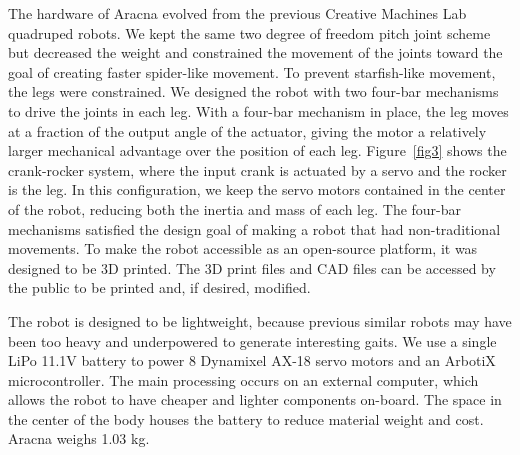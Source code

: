 \documentclass[letterpaper]{article}
\begin{document}

The hardware of Aracna evolved from the previous Creative Machines Lab
quadruped robots. We kept the same two degree of freedom pitch joint
scheme but decreased the weight and constrained the movement of the
joints toward the goal of creating faster spider-like movement. To
prevent starfish-like movement, the legs were constrained. We designed
the robot with two four-bar mechanisms to drive the joints in each
leg. With a four-bar mechanism in place, the leg moves at a fraction
of the output angle of the actuator, giving the motor a relatively
larger mechanical advantage over the position of each leg.
Figure~\ref{fig3} shows the crank-rocker system, where the input crank
is actuated by a servo and the rocker is the leg. In this
configuration, we keep the servo motors contained in the center of the
robot, reducing both the inertia and mass of each leg. The four-bar
mechanisms satisfied the design goal of making a robot that had
non-traditional movements.  To make the robot
accessible as an open-source platform, it was designed to be 3D
printed. The 3D print files and CAD files can be accessed by the
public to be printed and, if desired, modified.

The robot is designed to be lightweight, because previous similar
robots may have been too heavy and underpowered to generate
interesting gaits. We use a single LiPo 11.1V battery to
power 8 Dynamixel AX-18 servo motors and an ArbotiX
microcontroller. The main processing occurs on an external computer,
which allows the robot to have cheaper and lighter components
on-board. The space in the center of the body houses the
battery to reduce material weight and cost. Aracna weighs 1.03 kg.
\end{document}
